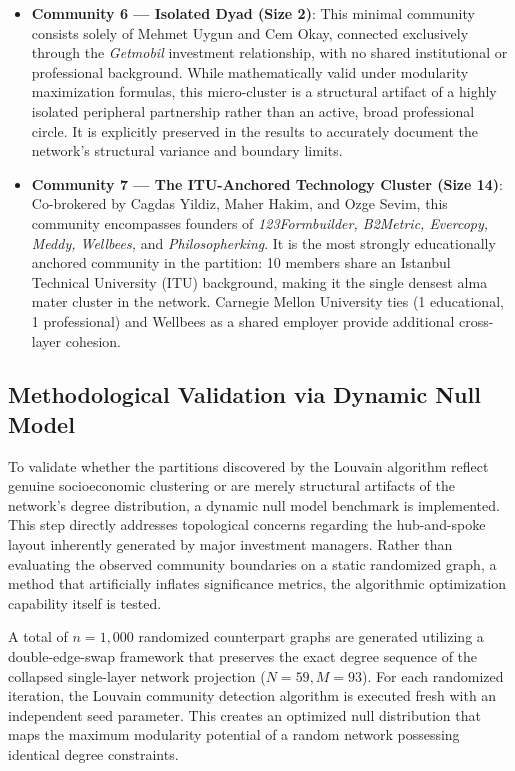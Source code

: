 \documentclass[conference]{IEEEtran}
\begin{document}
\begin{itemize}
    \item \textbf{Community 6 — Isolated Dyad (Size 2)}: This minimal community consists solely of Mehmet Uygun and Cem Okay, connected exclusively through the \textit{Getmobil} investment relationship, with no shared institutional or professional background. While mathematically valid under modularity maximization formulas, this micro-cluster is a structural artifact of a highly isolated peripheral partnership rather than an active, broad professional circle. It is explicitly preserved in the results to accurately document the network's structural variance and boundary limits.
    \item \textbf{Community 7 — The ITU-Anchored Technology Cluster (Size 14)}: Co-brokered by Cagdas Yildiz, Maher Hakim, and Ozge Sevim, this community encompasses founders of \textit{123Formbuilder, B2Metric, Evercopy, Meddy, Wellbees,} and \textit{Philosopherking}. It is the most strongly educationally anchored community in the partition: 10 members share an Istanbul Technical University (ITU) background, making it the single densest alma mater cluster in the network. Carnegie Mellon University ties (1 educational, 1 professional) and Wellbees as a shared employer provide additional cross-layer cohesion.
\end{itemize}

\subsection{Methodological Validation via Dynamic Null Model}

To validate whether the partitions discovered by the Louvain algorithm reflect genuine socioeconomic clustering or are merely structural artifacts of the network's degree distribution, a dynamic null model benchmark is implemented. This step directly addresses topological concerns regarding the hub-and-spoke layout inherently generated by major investment managers. Rather than evaluating the observed community boundaries on a static randomized graph, a method that artificially inflates significance metrics, the algorithmic optimization capability itself is tested.

A total of $n = 1,000$ randomized counterpart graphs are generated utilizing a double-edge-swap framework that preserves the exact degree sequence of the collapsed single-layer network projection ($N = 59, M = 93$). For each randomized iteration, the Louvain community detection algorithm is executed fresh with an independent seed parameter. This creates an optimized null distribution that maps the maximum modularity potential of a random network possessing identical degree constraints.
\end{document}
